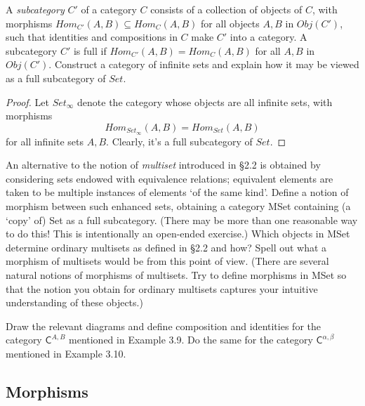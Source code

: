 \newpage
\begin{tcolorbox}[title=Problem 8, breakable]  
    A \emph{subcategory} $C'$ of a category $C$ consists of a collection of objects of $C$,
    with morphisms $Hom_{C'}(A, B) \subseteq Hom_C(A, B)$ for all objects $A, B$ in $Obj(C')$,
    such that identities and compositions in $C$ make $C'$ into a category.
    A subcategory $C'$ is full if $Hom_{C'}(A, B) = Hom_C(A, B)$ for all $A, B$ in $Obj(C')$.
    Construct a category of infinite sets and explain how it may be viewed as a full subcategory of $Set$.
\end{tcolorbox}

\begin{proof}
    Let $Set_{\infty}$ denote the category whose objects are all infinite sets,
    with morphisms 
    \[Hom_{Set_{\infty}}(A, B) = Hom_{Set}(A, B)\] for all infinite sets $A, B$.
    Clearly, it's a full subcategory of $Set$.
\end{proof}

\begin{tcolorbox}[title=Problem 9, breakable]  
    An alternative to the notion of \textit{multiset} introduced in \S2.2
    is obtained by considering sets endowed with equivalence relations; equivalent elements are taken
    to be multiple instances of elements `of the same kind'. Define a notion of morphism between such
    enhanced sets, obtaining a category \textsf{MSet} containing (a `copy' of) \textsf{Set} as a full
    subcategory. (There may be more than one reasonable way to do this! This is intentionally an
    open-ended exercise.) Which objects in \textsf{MSet} determine ordinary multisets as defined in
    \S2.2 and how? Spell out what a morphism of multisets would be from this point of view. (There
    are several natural notions of morphisms of multisets. Try to define morphisms in \textsf{MSet}
    so that the notion you obtain for ordinary multisets captures your intuitive understanding of these
    objects.)
\end{tcolorbox}

\begin{tcolorbox}[title=Problem 11, breakable] 
    Draw the relevant diagrams and define composition and identities
    for the category $\mathsf{C}^{A,B}$ mentioned in Example 3.9. Do the same for the category
    $\mathsf{C}^{\alpha,\beta}$ mentioned in Example 3.10. 
\end{tcolorbox}

\subsection{Morphisms}

